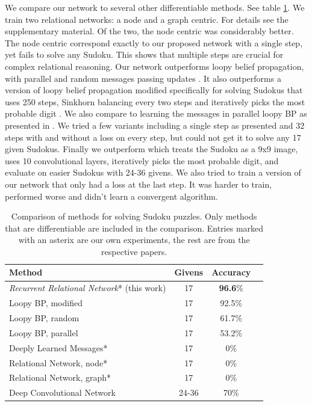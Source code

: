 \documentclass{article}
\begin{document}
We compare our network to several other differentiable methods.
See table \ref{table:sudoku-results}.
We train two relational networks: a node and a graph centric. For details see the supplementary material. Of the two, the node centric was considerably better. The node centric correspond exactly to our proposed network with a single step, yet fails to solve any Sudoku. This shows that multiple steps are crucial for complex relational reasoning.
Our network outperforms loopy belief propagation, with parallel and random messages passing updates \citep{bauke2008passing}.
It also outperforms a version of loopy belief propagation modified specifically for solving Sudokus that uses 250 steps, Sinkhorn balancing every two steps and iteratively picks the most probable digit \citep{khan2014solving}.
We also compare to learning the messages in parallel loopy BP as presented in \citet{lin2015deeply}.
We tried a few variants including a single step as presented and 32 steps with and without a loss on every step, but could not get it to solve any 17 given Sudokus.
Finally we outperform \citet{park2016can} which treats the Sudoku as a 9x9 image, uses 10 convolutional layers, iteratively picks the most probable digit, and evaluate on easier Sudokus with 24-36 givens.
We also tried to train a version of our network that only had a loss at the last step.
It was harder to train, performed worse and didn't learn a convergent algorithm.

\begin{table}[!ht]
\caption{Comparison of methods for solving Sudoku puzzles. Only methods that are differentiable are included in the comparison. Entries marked with an asterix are our own experiments, the rest are from the respective papers. }
\label{table:sudoku-results}
    \centering
	\begin{tabular}{lccc}
    \toprule
        Method & Givens & Accuracy \\ 
        \midrule        
		\emph{Recurrent Relational Network}* (this work)             & 17    & \textbf{96.6}\%  \\
        Loopy BP, modified  \citep{khan2014solving}                 & 17    & 92.5\% \\
        Loopy BP, random \citep{bauke2008passing}                   & 17    & 61.7\% \\
        Loopy BP, parallel \citep{bauke2008passing}                 & 17    & 53.2\% \\
        Deeply Learned Messages* \citep{lin2015deeply}               & 17    & 0\% \\
        Relational Network, node* \citep{santoro2017simple}          & 17    & 0\% \\
        Relational Network, graph* \citep{santoro2017simple}         & 17    & 0\% \\
        Deep Convolutional Network \citep{park2016can}              & 24-36 & 70\% \\
        \bottomrule
    \end{tabular}    
\end{table}
\end{document}
